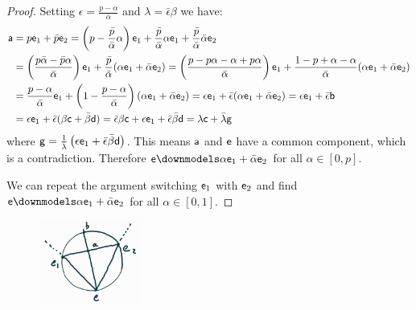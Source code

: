 \begin{mathSection}
\begin{proof}
	Setting $\epsilon = \frac{p - \alpha}{\bar{\alpha}}$ and $\lambda = \bar{\epsilon} \beta$ we have:
	\begin{align*}
		\ens[a] &= p \ens_1 + \bar{p} \ens_2 = \left(p - \frac{\bar{p}}{\bar{\alpha}} \alpha \right) \ens_1 + \frac{\bar{p}}{\bar{\alpha}} \alpha \ens_1 + \frac{\bar{p}}{\bar{\alpha}} \bar{\alpha}\ens_2 \\
		&= \left(\frac{p\bar{\alpha} - \bar{p}\alpha}{\bar{\alpha}} \right) \ens_1 + \frac{\bar{p}}{\bar{\alpha}} (\alpha \ens_1 + \bar{\alpha} \ens_2) = \left(\frac{p - p\alpha - \alpha + p \alpha}{\bar{\alpha}} \right) \ens_1 + \frac{1 - p + \alpha - \alpha}{\bar{\alpha}} (\alpha \ens_1 + \bar{\alpha} \ens_2) \\
		&= \frac{p - \alpha}{\bar{\alpha}}  \ens_1 + \left( 1 - \frac{p - \alpha}{\bar{\alpha}}\right) (\alpha \ens_1 + \bar{\alpha} \ens_2) = \epsilon \ens_1 + \bar{\epsilon} (\alpha \ens_1 + \bar{\alpha} \ens_2) = \epsilon \ens_1 + \bar{\epsilon} \ens[b] \\
		&= \epsilon \ens_1 + \bar{\epsilon} ( \beta \ens[c] + \bar{\beta} \ens[d] ) = \bar{\epsilon} \beta \ens[c] + \epsilon \ens_1 + \bar{\epsilon} \bar{\beta} \ens[d] = \lambda \ens[c] + \bar{\lambda} \ens[g]
	\end{align*}
	where $\ens[g] = \frac{1}{\bar{\lambda}}\left( \epsilon \ens_1 + \bar{\epsilon} \bar{\beta} \ens[d] \right)$. This means $\ens[a]$ and $\ens$ have a common component, which is a contradiction. Therefore $\ens \separate \alpha \ens_1 + \bar{\alpha} \ens_2$ for all $\alpha \in [0, p]$.
	
	We can repeat the argument switching $\ens_1$ with $\ens_2$ and find $\ens \separate \alpha \ens_1 + \bar{\alpha} \ens_2$ for all $\alpha \in [0, 1]$.
\end{proof}

\begin{figure}[H]
	\centering
	\includegraphics[width=0.3\textwidth]{tempimages/MixturesDoNotPreserveSeparateness.jpg}
\end{figure}


\end{mathSection}
